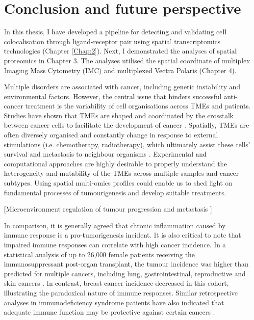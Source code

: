 \chapter[Conclusion and future perspective]{Conclusion and future perspective}
\label{Chap:Conclusion}
\pagestyle{headings}
In this thesis, I have developed a pipeline for detecting and validating cell colocalisation through ligand-receptor pair using spatial transcriptomics technologies (Chapter \ref{Chap:2}). Next, I demonstrated the analyses of spatial proteomics in Chapter 3. The analyses utilised the spatial coordinate of multiplex Imaging Mass Cytometry (IMC) and multiplexed Vectra Polaris  (Chapter 4).

Multiple disorders are associated with cancer, including genetic instability and environmental factors. However, the central issue that hinders successful anti-cancer treatment is the variability of cell organisations across TMEs and patients. Studies have shown that TMEs are shaped and coordinated by the crosstalk between cancer cells to facilitate the development of cancer \cite{jin2020updated, quail2013microenvironmental, schurch2020coordinated}. Spatially, TMEs are often diversely organised and constantly change in response to external stimulations (i.e. chemotherapy, radiotherapy), which ultimately assist these cells’ survival and metastasis to neighbour organisms \cite{wu2022spatial}. Experimental and computational approaches are highly desirable to properly understand the heterogeneity and mutability of the TMEs across multiple samples and cancer subtypes. Using spatial multi-omics profiles could enable us to shed light on fundamental processes of tumourigenesis and develop suitable treatments.  

[Microenvironment regulation of tumour progression and metastasis ] 
 

In comparison, it is generally agreed that chronic inflammation caused by immune response is a pro-tumorigenesis incident. It is also critical to note that impaired immune responses can correlate with high cancer incidence. In a statistical analysis of up to 26,000 female patients receiving the immunosuppressant post-organ transplant, the tumour incidence was higher than predicted for multiple cancers, including lung, gastrointestinal, reproductive and skin cancers \cite{stewart1995incidence}. In contrast, breast cancer incidence decreased in this cohort, illustrating the paradoxical nature of immune responses.   Similar retrospective analyses in immunodeficiency syndrome patients have also indicated that adequate immune function may be protective against certain cancers \cite{quail2013microenvironmental}.  


